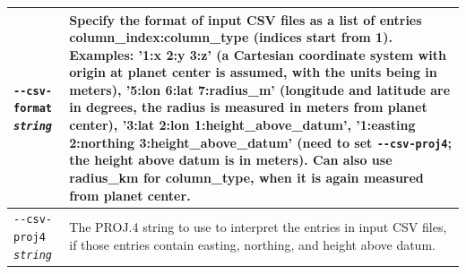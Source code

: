 \begin{longtable}{|p{8cm}|p{9cm}|}
\texttt{-\/-csv-format \textit{string}} & Specify the format of input
CSV files as a list of entries column\_index:column\_type (indices start
from 1). Examples: '1:x 2:y 3:z' (a Cartesian coordinate system with
origin at planet center is assumed, with the units being in meters),
'5:lon 6:lat 7:radius\_m' (longitude and latitude are in degrees, the
radius is measured in meters from planet center), '3:lat 2:lon
1:height\_above\_datum', '1:easting 2:northing 3:height\_above\_datum'
(need to set \texttt{-\/-csv-proj4}; the height above datum is in
meters). Can also use radius\_km for column\_type, when it is again
measured from planet center. \\ \hline

\texttt{-\/-csv-proj4 \textit{string}} & The PROJ.4 string to use to
interpret the entries in input CSV files, if those entries contain
easting, northing, and height above datum. \\ \hline


\end{longtable}
